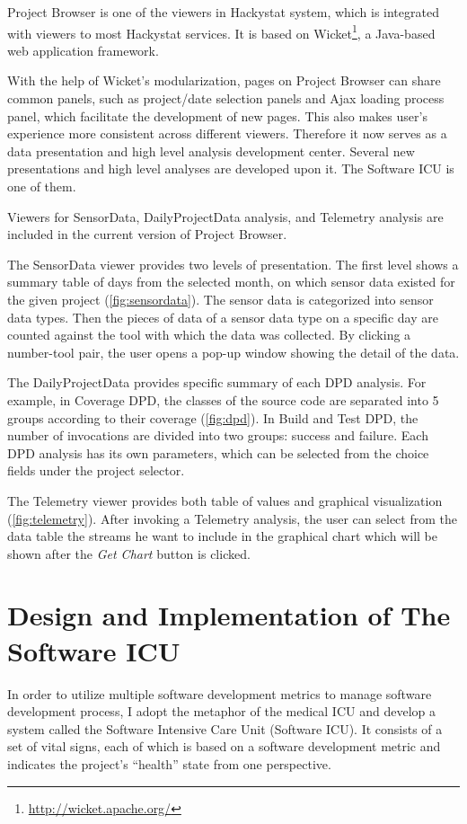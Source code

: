 Project Browser is one of the viewers in Hackystat system, which is integrated with viewers to most Hackystat services. It is based on Wicket\footnote{\url{http://wicket.apache.org/}}, a Java-based web application framework.

With the help of Wicket's modularization, pages on Project Browser can share common panels, such as project/date selection panels and Ajax loading process panel, which facilitate the development of new pages. This also makes user's experience more consistent across different viewers. Therefore it now serves as a data presentation and high level analysis development center. Several new presentations and high level analyses are developed upon it. The Software ICU is one of them.

Viewers for SensorData, DailyProjectData analysis, and Telemetry analysis are included in the current version of Project Browser.

The SensorData viewer provides two levels of presentation. The first level shows a summary table of days from the selected month, on which sensor data existed for the given project (\autoref{fig:sensordata}). The sensor data is categorized into sensor data types. Then the pieces of data of a sensor data type on a specific day are counted against the tool with which the data was collected. By clicking a number-tool pair, the user opens a pop-up window showing the detail of the data.

The DailyProjectData provides specific summary of each DPD analysis. For example, in Coverage DPD, the classes of the source code are separated into 5 groups according to their coverage (\autoref{fig:dpd}). In Build and Test DPD, the number of invocations are divided into two groups: success and failure. Each DPD analysis has its own parameters, which can be selected from the choice fields under the project selector.

The Telemetry viewer provides both table of values and graphical visualization (\autoref{fig:telemetry}). After invoking a Telemetry analysis, the user can select from the data table the streams he want to include in the graphical chart which will be shown after the {\it Get Chart} button is clicked.



\chapter{Design and Implementation of The Software ICU}
\label{sicu}
In order to utilize multiple software development metrics to manage software development process, I adopt the metaphor of the medical ICU and develop a system called the Software Intensive Care Unit (Software ICU). It consists of a set of vital signs, each of which is based on a software development metric and indicates the project's ``health'' state from one perspective.



